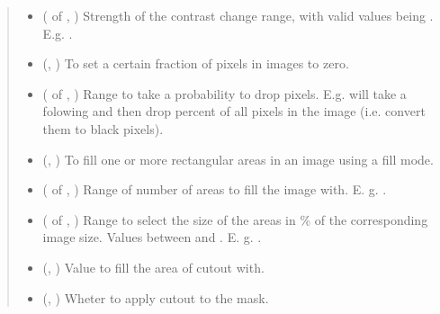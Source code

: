 \documentclass[letterpaper,10pt,english]{sphinxmanual}
\begin{document}
\begin{fulllineitems}
\begin{quote}
\begin{description}
\begin{itemize}
\item {} 
 ( of , ) \textendash{} Strength of the contrast change range, with valid values being .
E.g. .

\item {} 
 (, ) \textendash{} To set a certain fraction of pixels in images to zero.

\item {} 
 ( of , ) \textendash{} Range to take a probability  to drop pixels. E.g.  will take a  folowing 
and then drop  percent of all pixels in the image (i.e. convert them to black pixels).

\item {} 
 (, ) \textendash{} To fill one or more rectangular areas in an image using a fill mode.

\item {} 
 ( of , ) \textendash{} Range of number of areas to fill the image with. E. g. .

\item {} 
 ( of , ) \textendash{} Range to select the size of the areas in \% of the corresponding
image size. Values between  and . E. g. .

\item {} 
 (, ) \textendash{} Value to fill the area of cutout with.

\item {} 
 (, ) \textendash{} Wheter to apply cutout to the mask.


\end{itemize}
\end{description}
\end{quote}
\end{fulllineitems}
\end{document}
